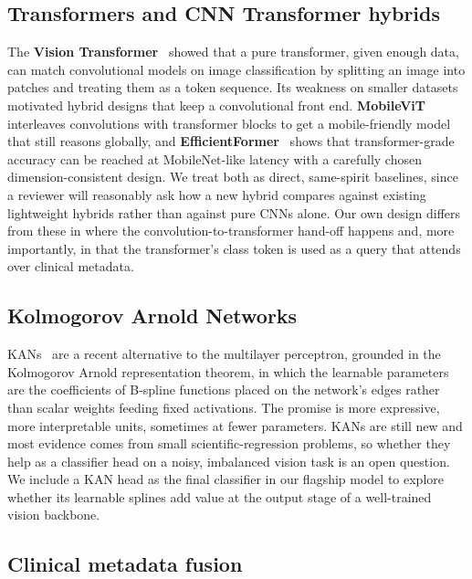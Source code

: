 \subsection{Transformers and CNN Transformer hybrids}

The \textbf{Vision Transformer}~\cite{dosovitskiy2021vit} showed that a pure
transformer, given enough data, can match convolutional models on image
classification by splitting an image into patches and treating them as a token
sequence. Its weakness on smaller datasets motivated hybrid designs that keep a
convolutional front end. \textbf{MobileViT}~\cite{mehta2022mobilevit} interleaves
convolutions with transformer blocks to get a mobile-friendly model that still
reasons globally, and \textbf{EfficientFormer}~\cite{li2022efficientformer} shows
that transformer-grade accuracy can be reached at MobileNet-like latency with a
carefully chosen dimension-consistent design. We treat both as direct,
same-spirit baselines, since a reviewer will reasonably ask how a new hybrid
compares against existing lightweight hybrids rather than against pure CNNs
alone. Our own design differs from these in where the convolution-to-transformer
hand-off happens and, more importantly, in that the transformer's class token is
used as a query that attends over clinical metadata.

\subsection{Kolmogorov Arnold Networks}

KANs~\cite{liu2024kan} are a recent alternative to the multilayer perceptron,
grounded in the Kolmogorov Arnold representation theorem, in which the learnable
parameters are the coefficients of B-spline functions placed on the network's
edges rather than scalar weights feeding fixed activations. The promise is more
expressive, more interpretable units, sometimes at fewer parameters. KANs are
still new and most evidence comes from small scientific-regression problems, so
whether they help as a classifier head on a noisy, imbalanced vision task is an
open question. We include a KAN head as the final classifier in our flagship
model to explore whether its learnable splines add value at the output stage of
a well-trained vision backbone.

\subsection{Clinical metadata fusion}


